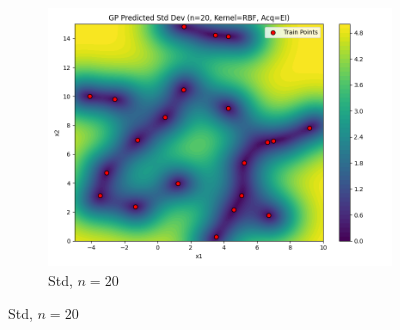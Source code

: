 \documentclass[a4paper,12pt]{article}
\begin{document}
\begin{figure}[H]
\begin{subfigure}{0.3\textwidth}
    \includegraphics[width=\linewidth]{Task-02/images/gp_std_rbf_n20_EI.png}
    \caption{Std, $n=20$}
\end{subfigure}


\end{figure}
\end{document}
